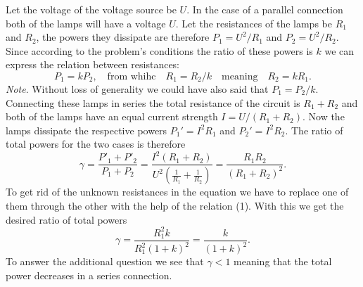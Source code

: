 {\ifEngSolution
Let the voltage of the voltage source be $U$. In the case of a parallel connection both of the lamps will have a voltage $U$. Let the resistances of the lamps be $R_1$ and $R_2$, the powers they dissipate are therefore $P_1=U^2/R_1$ and $P_2=U^2/R_2$. Since according to the problem’s conditions the ratio of these powers is $k$ we can express the relation between resistances:
\begin{equation}
\label{eq:R12suhe}
P_1 = kP_2, \quad \text{from whihc} \quad R_1 = R_2/k \quad \text{meaning} \quad R_2=kR_1.
\end{equation}
\emph{Note}. Without loss of generality we could have also said that $P_1 = P_2/k$.\\
Connecting these lamps in series the total resistance of the circuit is $R_1+R_2$ and both of the lamps have an equal current strength $I=U/(R_1+R_2)$. Now the lamps dissipate the respective powers $P_1'=I^2R_1$ and $P_2'=I^2R_2$.
The ratio of total powers for the two cases is therefore
\[
\gamma = \frac{P'_1+P'_2}{P_1+P_2} = \frac{I^2(R_1+R_2)}{U^2(\frac{1}{R_1}+\frac{1}{R_2})}=
\frac{R_1R_2}{(R_1+R_2)^2}.
\] 
To get rid of the unknown resistances in the equation we have to replace one of them through the other with the help of the relation (1). With this we get the desired ratio of total powers
\[
\gamma = \frac{R_1^2 k}{R_1^2(1+k)^2} = \frac{k}{(1+k)^2}.
\] 
To answer the additional question we see that $\gamma < 1$ meaning that the total power decreases in a series connection.
\fi
}
